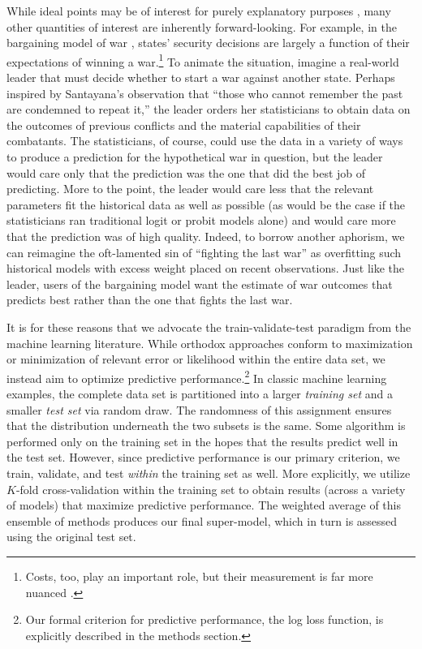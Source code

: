 While ideal points may be of interest for purely explanatory purposes \citep{clarke2012}, many other quantities of interest are inherently forward-looking. 
For example, in the bargaining model of war \citep{fearon1995}, states' security decisions are largely a function of their expectations of winning a war.\footnote{Costs, too, play an important role, but their measurement is far more nuanced \citep{stiglitz2008,stiglitz2012}.} 
To animate the situation, imagine a real-world leader that must decide whether to start a war against another state. 
Perhaps inspired by Santayana's observation that ``those who cannot remember the past are condemned to repeat it,'' the leader orders her statisticians to obtain data on the outcomes of previous conflicts and the material capabilities of their combatants. 
The statisticians, of course, could use the data in a variety of ways to produce a prediction for the hypothetical war in question, but the leader would care only that the prediction was the one that did the best job of predicting. 
More to the point, the leader would care less that the relevant parameters fit the historical data as well as possible (as would be the case if the statisticians ran traditional logit or probit models alone) and would care more that the prediction was of high quality. 
Indeed, to borrow another aphorism, we can reimagine the oft-lamented sin of ``fighting the last war'' \citep[e.g.][]{hart1972} as overfitting such historical models with excess weight placed on recent observations. 
Just like the leader, users of the bargaining model want the estimate of war outcomes that predicts best rather than the one that fights the last war.

It is for these reasons that we advocate the train-validate-test paradigm from the machine learning literature. 
While orthodox approaches conform to maximization or minimization of relevant error or likelihood within the entire data set, we instead aim to optimize predictive performance.\footnote{Our formal criterion for predictive performance, the log loss function, is explicitly described in the methods section.} 
In classic machine learning examples, the complete data set is partitioned into a larger \emph{training set} and a smaller \emph{test set} via random draw. 
The randomness of this assignment ensures that the distribution underneath the two subsets is the same. 
Some algorithm is performed only on the training set in the hopes that the results predict well in the test set. 
However, since predictive performance is our primary criterion, we train, validate, and test \emph{within} the training set as well. 
More explicitly, we utilize $K$-fold cross-validation within the training set to obtain results (across a variety of models) that maximize predictive performance. 
The weighted average of this ensemble of methods produces our final super-model, which in turn is assessed using the original test set.

